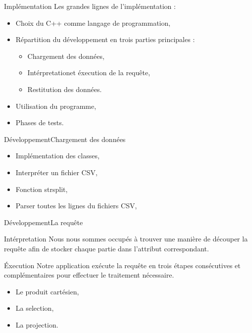 \documentclass[10pt,handout]{beamer}
\begin{document}
\begin{frame}{Implémentation}
  Les grandes lignes de l'implémentation : 
  \begin{itemize}
    \item Choix du C++ comme langage de programmation,
    \item Répartition du développement en trois parties principales :
    \begin{itemize}
      \item Chargement des données,
      \item Intérpretationet éxecution de la requête,
      \item Restitution des données.
    \end{itemize}
    \item Utilisation du programme,
    \item Phases de tests.
  \end{itemize}
\end{frame}

\begin{frame}{Développement}{Chargement des données}
  \begin{itemize}
    \item Implémentation des classes,
    \item Interpréter un fichier CSV,
    \item Fonction strsplit,
    \item Parser toutes les lignes du fichiers CSV,
  \end{itemize}
\end{frame}

\begin{frame}{Développement}{La requête}
  \begin{block}{Intérpretation}
    Nous nous sommes occupés à trouver une manière de découper la requête afin de stocker chaque partie dans l’attribut correspondant.
  \end{block}
  
  \begin{block}{Éxecution}
    Notre application exécute la requête en trois étapes consécutives et complémentaires pour effectuer le traitement nécessaire.
    \begin{itemize}
      \item Le produit cartésien,
      \item La selection,
      \item La projection.
    \end{itemize}
  \end{block}
\end{frame}
\end{document}

